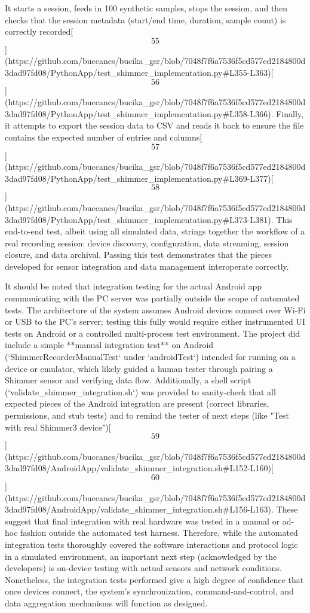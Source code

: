 \documentclass[12pt,a4paper]{article}
\begin{document}
{It starts a session, feeds in 100 synthetic samples, stops the session,
and then checks that the session metadata (start/end time, duration,
sample count) is correctly
recorded[\[55\]](https://github.com/buccancs/bucika_gsr/blob/7048f7f6a7536f5cd577ed2184800d3dad97fd08/PythonApp/test_shimmer_implementation.py#L355-L363)[\[56\]](https://github.com/buccancs/bucika_gsr/blob/7048f7f6a7536f5cd577ed2184800d3dad97fd08/PythonApp/test_shimmer_implementation.py#L358-L366).
Finally, it attempts to export the session data to CSV and reads it back
to ensure the file contains the expected number of entries and
columns[\[57\]](https://github.com/buccancs/bucika_gsr/blob/7048f7f6a7536f5cd577ed2184800d3dad97fd08/PythonApp/test_shimmer_implementation.py#L369-L377)[\[58\]](https://github.com/buccancs/bucika_gsr/blob/7048f7f6a7536f5cd577ed2184800d3dad97fd08/PythonApp/test_shimmer_implementation.py#L373-L381).
This end-to-end test, albeit using all simulated data, strings together
the workflow of a real recording session: device discovery,
configuration, data streaming, session closure, and data archival.
Passing this test demonstrates that the pieces developed for sensor
integration and data management interoperate correctly.

It should be noted that integration testing for the actual Android app
communicating with the PC server was partially outside the scope of
automated tests. The architecture of the system assumes Android devices
connect over Wi-Fi or USB to the PC's server; testing this fully would
require either instrumented UI tests on Android or a controlled
multi-process test environment. The project did include a simple
**manual integration test** on Android (`ShimmerRecorderManualTest`
under `androidTest`) intended for running on a device or emulator, which
likely guided a human tester through pairing a Shimmer sensor and
verifying data flow. Additionally, a shell script
(`validate_shimmer_integration.sh`) was provided to sanity-check that
all expected pieces of the Android integration are present (correct
libraries, permissions, and stub tests) and to remind the tester of next
steps (like "Test with real Shimmer3
device")[\[59\]](https://github.com/buccancs/bucika_gsr/blob/7048f7f6a7536f5cd577ed2184800d3dad97fd08/AndroidApp/validate_shimmer_integration.sh#L152-L160)[\[60\]](https://github.com/buccancs/bucika_gsr/blob/7048f7f6a7536f5cd577ed2184800d3dad97fd08/AndroidApp/validate_shimmer_integration.sh#L156-L163).
These suggest that final integration with real hardware was tested in a
manual or ad-hoc fashion outside the automated test harness. Therefore,
while the automated integration tests thoroughly covered the software
interactions and protocol logic in a simulated environment, an important
next step (acknowledged by the developers) is on-device testing with
actual sensors and network conditions. Nonetheless, the integration
tests performed give a high degree of confidence that once devices
connect, the system's synchronization, command-and-control, and data
aggregation mechanisms will function as designed.

}
\end{document}
